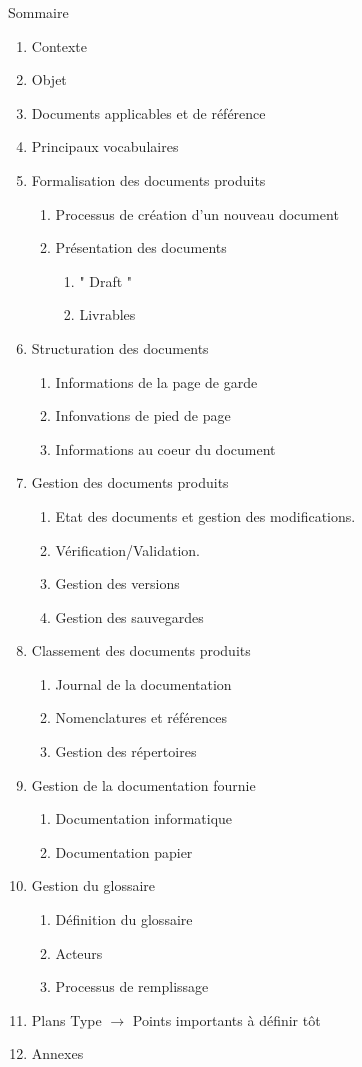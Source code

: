 Sommaire
\begin{enumerate}
\item Contexte
\item Objet
\item Documents applicables et de référence
\item Principaux vocabulaires
\item Formalisation des documents produits
	\begin{enumerate}
	\item Processus de création d'un nouveau document
	\item Présentation des documents
		\begin{enumerate}
		\item " Draft "
		\item Livrables
		\end{enumerate}
	\end{enumerate}
\item Structuration des documents
	\begin{enumerate}
	\item Informations de la page de garde
	\item Infonvations de pied de page
	\item Informations au coeur du document
	\end{enumerate}
\item Gestion des documents produits
	\begin{enumerate}
	\item Etat des documents et gestion des modifications.
	\item Vérification/Validation.
	\item Gestion des versions
	\item Gestion des sauvegardes
	\end{enumerate}
\item Classement des documents produits
	\begin{enumerate}
	\item Journal de la documentation
	\item Nomenclatures et références 
	\item Gestion des répertoires
	\end{enumerate}
\item Gestion de la documentation fournie
	\begin{enumerate}
	\item Documentation informatique
	\item Documentation papier
	\end{enumerate}
\item Gestion du glossaire
	\begin{enumerate}
	\item Définition du glossaire
	\item Acteurs
	\item Processus de remplissage
	\end{enumerate}
\item Plans Type $\rightarrow$ Points importants à définir tôt
\item Annexes
\end{enumerate}

